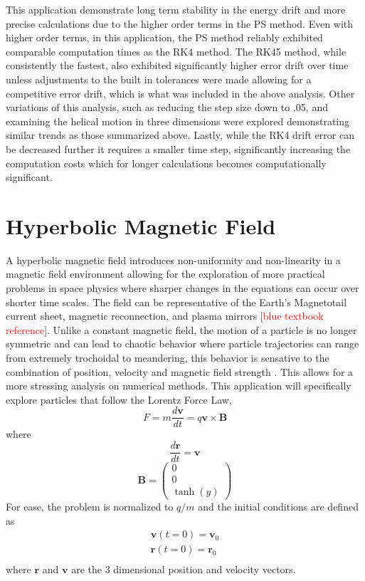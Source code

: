 \documentclass{article}
\begin{document}
    
This application demonstrate long term stability in the energy drift and more precise calculations due to the higher order terms in the PS method. Even with higher order terms, in this application, the PS method reliably exhibited comparable computation times as the RK4 method. The RK45 method, while consistently the fastest, also exhibited significantly higher error drift over time unless adjustments to the built in tolerances were made allowing for a competitive error drift, which is what was included in the above analysis. Other variations of this analysis, such as reducing the step size down to .05, and examining the helical motion in three dimensions were explored demonstrating similar trends as those summarized above. Lastly, while the RK4 drift error can be decreased further it requires a smaller time step, significantly increasing the computation costs which for longer calculations becomes computationally significant. 

\section{Hyperbolic Magnetic Field}
A hyperbolic magnetic field introduces non-uniformity and non-linearity in a magnetic field environment allowing for the exploration of more practical problems in space physics where sharper changes in the equations can occur over shorter time scales. The field can be representative of the Earth's Magnetotail current sheet, magnetic reconnection, and plasma mirrors [\textcolor{red}{blue textbook reference}]. Unlike a constant magnetic field, the motion of a particle is no longer symmetric and can lead to chaotic behavior where particle trajectories can range from extremely trochoidal to meandering, this behavior is sensative to the combination of position, velocity and magnetic field strength \cite{astrom}. This allows for a more stressing analysis on numerical methods. This application will specifically explore particles that follow the Lorentz Force Law,
    \begin{equation} 
        F=m\frac{d\mathbf{v}}{dt}=q\mathbf{v}\times\mathbf{B}
    \end{equation}
where
    \begin{equation}  
        \frac{d\mathbf{r}}{dt}=\mathbf{v}
    \end{equation}
    \begin{equation}
        \mathbf{B}=\begin{pmatrix}
            0\\0\\\tanh (y)
        \end{pmatrix}
    \end{equation}
For ease, the problem is normalized to $q/m$ and the initial conditions are defined as 
    \begin{equation}
        \begin{split}
            \mathbf{v}(t=0)=\mathbf{v}_0\\
            \mathbf{r}(t=0)=\mathbf{r}_0\\
        \end{split}
    \end{equation}
where $\mathbf{r}$ and $\mathbf{v}$ are the 3 dimensional position and velocity vectors.
\end{document}
